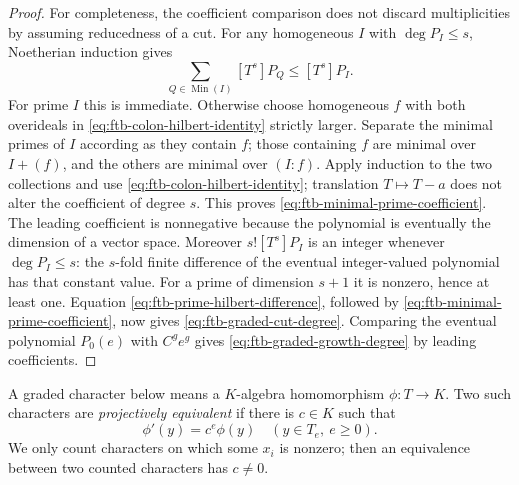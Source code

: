 \begin{proof}
For completeness, the coefficient comparison does not discard
multiplicities by assuming reducedness of a cut.
For any homogeneous \(I\) with \(\deg P_I\le s\),
Noetherian induction gives
\[
       \sum_{Q\in\operatorname{Min}(I)}[T^s]P_Q
                                     \le[T^s]P_I.
 \tag{TZ6}\label{eq:ftb-minimal-prime-coefficient}
\]
For prime \(I\) this is immediate.
Otherwise choose homogeneous \(f\) with both overideals
in \eqref{eq:ftb-colon-hilbert-identity} strictly larger.
Separate the minimal primes of \(I\) according as they contain
\(f\); those containing \(f\) are minimal over \(I+(f)\),
and the others are minimal over \((I:f)\).
Apply induction to the two collections and use
\eqref{eq:ftb-colon-hilbert-identity}; translation \(T\mapsto T-a\)
does not alter the coefficient of degree \(s\).
This proves \eqref{eq:ftb-minimal-prime-coefficient}.
The leading coefficient is nonnegative because the polynomial
is eventually the dimension of a vector space.
Moreover \(s![T^s]P_I\) is an integer whenever \(\deg P_I\le s\):
the \(s\)-fold finite difference of the eventual
integer-valued polynomial has that constant value.
For a prime of dimension \(s+1\) it is nonzero, hence at least one.
Equation \eqref{eq:ftb-prime-hilbert-difference}, followed by
\eqref{eq:ftb-minimal-prime-coefficient}, now gives
\eqref{eq:ftb-graded-cut-degree}.
Comparing the eventual polynomial \(P_0(e)\) with \(C^ge^g\)
gives \eqref{eq:ftb-graded-growth-degree} by leading coefficients.
\end{proof}

A graded character below means a \(K\)-algebra homomorphism
\(\phi:T\to K\).  Two such characters are \emph{projectively
equivalent} if there is \(c\in K\) such that
\[
                \phi'(y)=c^e\phi(y)
                         \quad(y\in T_e,\ e\ge0).
 \tag{TZ7}\label{eq:ftb-graded-scaling}
\]
We only count characters on which some \(x_i\) is nonzero;
then an equivalence between two counted characters has \(c\ne0\).

